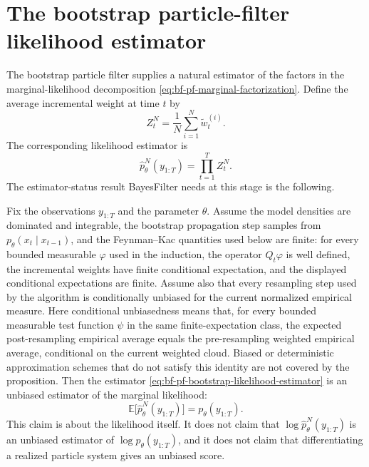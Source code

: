\section{The bootstrap particle-filter likelihood estimator}
\label{sec:bf-pf-likelihood-estimator}

The bootstrap particle filter supplies a natural estimator of the factors in the
marginal-likelihood decomposition
\eqref{eq:bf-pf-marginal-factorization}.  Define the average incremental weight
at time $t$ by
\begin{equation}
\label{eq:bf-pf-average-weight}
  Z_t^N = \frac{1}{N}\sum_{i=1}^N \tilde w_t^{(i)}.
\end{equation}
The corresponding likelihood estimator is
\begin{equation}
\label{eq:bf-pf-bootstrap-likelihood-estimator}
  \hat p_\theta^N(y_{1:T}) = \prod_{t=1}^T Z_t^N.
\end{equation}
The estimator-status result BayesFilter needs at this stage is the following.

\begin{proposition}
\label{prop:bf-pf-bootstrap-likelihood-status}
Fix the observations $y_{1:T}$ and the parameter $\theta$.  Assume the model
densities are dominated and integrable, the bootstrap propagation step samples
from $p_\theta(x_t\mid x_{t-1})$, and the Feynman--Kac quantities used below
are finite: for every bounded measurable $\varphi$ used in the induction,
the operator $Q_t\varphi$ is well defined, the incremental weights have finite
conditional expectation, and the displayed conditional expectations are finite.
Assume also that every resampling step used by the algorithm is conditionally
unbiased for the current normalized empirical measure.  Here conditional
unbiasedness means that, for every bounded measurable test function $\psi$ in
the same finite-expectation class, the expected post-resampling empirical
average equals the pre-resampling weighted empirical average, conditional on
the current weighted cloud.  Biased or deterministic approximation schemes that
do not satisfy this identity are not covered by the proposition.  Then the
estimator
\eqref{eq:bf-pf-bootstrap-likelihood-estimator} is an unbiased estimator of the
marginal likelihood:
\[
  \mathbb{E}\bigl[\hat p_\theta^N(y_{1:T})\bigr] = p_\theta(y_{1:T}).
\]
This claim is about the likelihood itself.  It does not claim that
$\log \hat p_\theta^N(y_{1:T})$ is an unbiased estimator of
$\log p_\theta(y_{1:T})$, and it does not claim that differentiating a realized
particle system gives an unbiased score.
\end{proposition}

